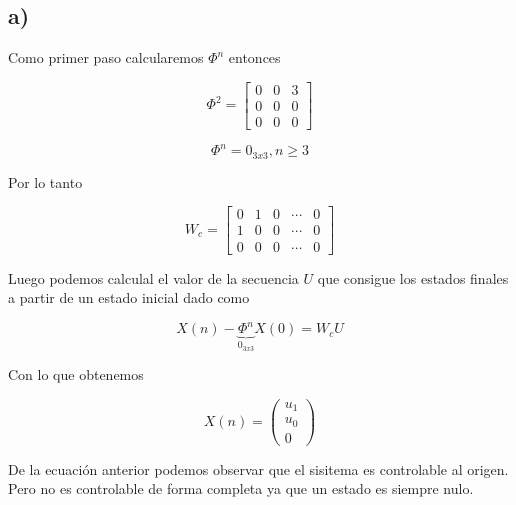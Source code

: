 \documentclass[11pt,a4paper]{article}
\begin{document}
    \subsection*{a)}

    Como primer paso calcularemos $\Phi^n$ entonces 

    \begin{equation}
        \Phi^2 = 
        \begin{bmatrix}
            0 & 0 & 3 \\ 
            0 & 0 & 0 \\
            0 & 0 & 0 
        \end{bmatrix}
    \end{equation}
    
    \begin{equation}
        \Phi^n = 0_{3x3} , n \geq 3
    \end{equation}



    Por lo tanto 

    \begin{equation}
        W_c = 
        \begin{bmatrix}
            0 & 1 & 0 & \cdots & 0 \\ 
            1 & 0 & 0 & \cdots & 0 \\ 
            0 & 0 & 0 & \cdots & 0 
        \end{bmatrix}
    \end{equation}

    Luego podemos calculal el valor de la secuencia $U$ que consigue los estados finales a partir de 
    un estado inicial dado como 

    \begin{equation}
        X(n) - \underbrace{\Phi^n}_{0_{3x3}} X(0) = W_c U
    \end{equation}

    Con lo que obtenemos 

    \begin{equation}
        \label{eq:3-x-n}
        X(n) = 
        \begin{pmatrix}
            u_1 \\ u_0 \\ 0
        \end{pmatrix}
    \end{equation}

    De la ecuación anterior podemos observar que el sisitema es controlable al origen.
    Pero no es controlable de forma completa ya que un estado es siempre nulo.
\end{document}
